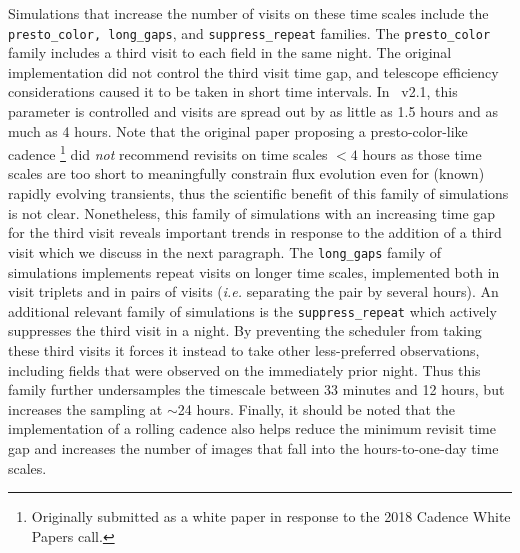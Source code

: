 Simulations that increase the number of visits on these time scales include the \texttt{presto\_color, long\_gaps}, and \texttt{suppress\_repeat} families. The \texttt{presto\_color} family includes a third visit to each field in the same night. The original implementation did not control the third visit time gap, and telescope efficiency considerations caused it to be taken in short time intervals. In \opsim\ v2.1, this parameter is controlled and visits are spread out by as little as 1.5 hours and as much as 4 hours. Note that the original paper proposing a presto-color-like cadence \citep{2019PASP..131f8002B}\footnote{Originally submitted as a white paper in response to the 2018 Cadence White Papers call.} did \emph{not} recommend revisits on time scales $<4$ hours as those time scales are too short to meaningfully constrain flux evolution even for (known) rapidly evolving transients, thus the scientific benefit of this family of simulations is not clear. Nonetheless, this family of simulations with an increasing time gap for the third visit reveals important trends in response to the addition of a third visit which we discuss in the next paragraph. The \texttt{long\_gaps} family of simulations implements repeat visits on longer time scales, implemented both in visit triplets and in pairs of visits (\emph{i.e.} separating the pair by several hours).
An additional relevant family of simulations is the \texttt{suppress\_repeat} which actively suppresses the third visit in a night. By preventing the scheduler from taking these third visits it forces it instead to take other less-preferred observations, including fields that were observed on the immediately prior night. Thus this family further undersamples the timescale between 33 minutes and 12 hours, but increases the sampling at $\sim$24 hours. Finally, it should be noted that the implementation of a rolling cadence also helps reduce the minimum revisit time gap and increases the number of images that fall into the hours-to-one-day time scales.


